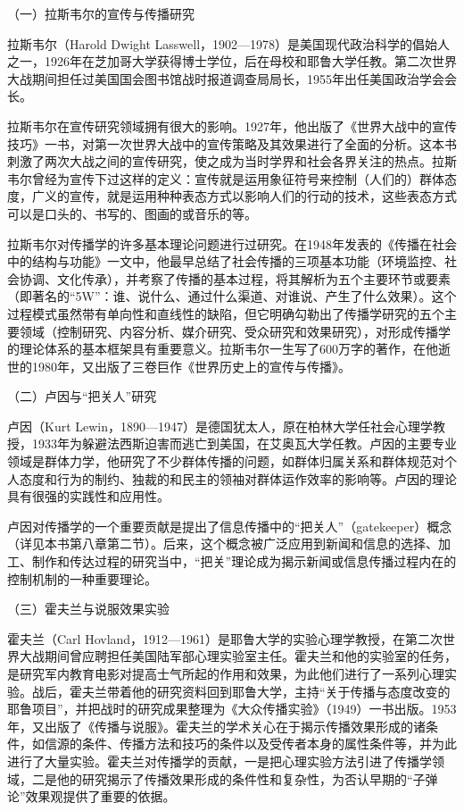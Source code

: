 \documentclass[UTF8,12pt]{ctexart}
\numberwithin{equation}{section} %
\numberwithin{figure}{section}
\numberwithin{table}{section}
\begin{document}
	（一）拉斯韦尔的宣传与传播研究
	
	拉斯韦尔（Harold Dwight Lasswell，1902—1978）是美国现代政治科学的倡始人之一，1926年在芝加哥大学获得博士学位，后在母校和耶鲁大学任教。第二次世界大战期间担任过美国国会图书馆战时报道调查局局长，1955年出任美国政治学会会长。
	
	拉斯韦尔在宣传研究领域拥有很大的影响。1927年，他出版了《世界大战中的宣传技巧》一书，对第一次世界大战中的宣传策略及其效果进行了全面的分析。这本书刺激了两次大战之间的宣传研究，使之成为当时学界和社会各界关注的热点。拉斯韦尔曾经为宣传下过这样的定义：宣传就是运用象征符号来控制（人们的）群体态度，广义的宣传，就是运用种种表态方式以影响人们的行动的技术，这些表态方式可以是口头的、书写的、图画的或音乐的等。
	
	拉斯韦尔对传播学的许多基本理论问题进行过研究。在1948年发表的《传播在社会中的结构与功能》一文中，他最早总结了社会传播的三项基本功能（环境监控、社会协调、文化传承），并考察了传播的基本过程，将其解析为五个主要环节或要素（即著名的“5W”：谁、说什么、通过什么渠道、对谁说、产生了什么效果）。这个过程模式虽然带有单向性和直线性的缺陷，但它明确勾勒出了传播学研究的五个主要领域（控制研究、内容分析、媒介研究、受众研究和效果研究），对形成传播学的理论体系的基本框架具有重要意义。拉斯韦尔一生写了600万字的著作，在他逝世的1980年，又出版了三卷巨作《世界历史上的宣传与传播》。
	
	（二）卢因与“把关人”研究
	
	卢因（Kurt Lewin，1890—1947）是德国犹太人，原在柏林大学任社会心理学教授，1933年为躲避法西斯迫害而逃亡到美国，在艾奥瓦大学任教。卢因的主要专业领域是群体力学，他研究了不少群体传播的问题，如群体归属关系和群体规范对个人态度和行为的制约、独裁的和民主的领袖对群体运作效率的影响等。卢因的理论具有很强的实践性和应用性。
	
	卢因对传播学的一个重要贡献是提出了信息传播中的“把关人”（gatekeeper）概念（详见本书第八章第二节）。后来，这个概念被广泛应用到新闻和信息的选择、加工、制作和传达过程的研究当中，“把关”理论成为揭示新闻或信息传播过程内在的控制机制的一种重要理论。
	
	（三）霍夫兰与说服效果实验
	
	霍夫兰（Carl Hovland，1912—1961）是耶鲁大学的实验心理学教授，在第二次世界大战期间曾应聘担任美国陆军部心理实验室主任。霍夫兰和他的实验室的任务，是研究军内教育电影对提高士气所起的作用和效果，为此他们进行了一系列心理实验。战后，霍夫兰带着他的研究资料回到耶鲁大学，主持“关于传播与态度改变的耶鲁项目”，并把战时的研究成果整理为《大众传播实验》（1949）一书出版。1953年，又出版了《传播与说服》。霍夫兰的学术关心在于揭示传播效果形成的诸条件，如信源的条件、传播方法和技巧的条件以及受传者本身的属性条件等，并为此进行了大量实验。霍夫兰对传播学的贡献，一是把心理实验方法引进了传播学领域，二是他的研究揭示了传播效果形成的条件性和复杂性，为否认早期的“子弹论”效果观提供了重要的依据。
	
\end{document}
